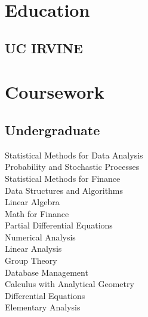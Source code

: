 \documentclass[]{deedy-resume-openfont}
\begin{document}
%
%


%
%

\begin{minipage}[t]{0.33\textwidth} 


\section{Education} 

\subsection{UC IRVINE}
\sectionsep


\section{Coursework}
\subsection{Undergraduate} 
Statistical Methods for Data Analysis \\
Probability and Stochastic Processes \\
Statistical Methods for Finance \\
Data Structures and Algorithms  \\
Linear Algebra \\
Math for Finance \\ 
Partial Differential Equations \\
Numerical Analysis \\
Linear Analysis \\
Group Theory \\
Database Management \\
Calculus with Analytical Geometry \\
Differential Equations \\
Elementary Analysis
\sectionsep


\end{minipage}
\end{document}
